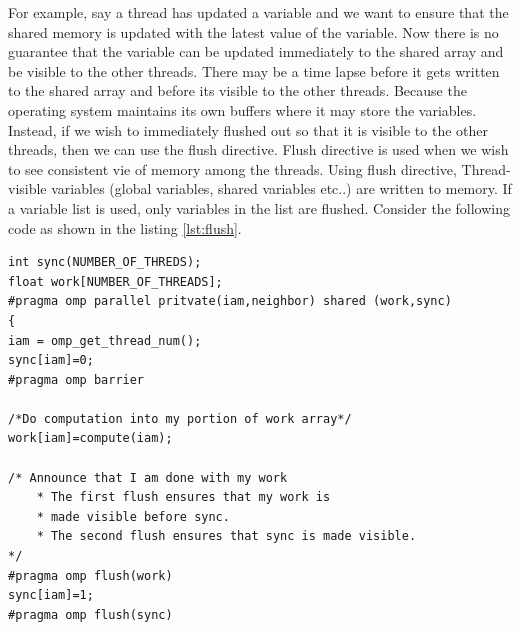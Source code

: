 \documentclass[12pt]{book}
\begin{document}
\begin{itemize}
    For example, say a thread has updated a variable and we want to ensure that the shared memory is updated with the latest value of the variable. Now there is no guarantee that the variable can be updated immediately to the shared array and be visible to the other threads. There may be a time lapse before it gets written to the shared array and before its visible to the other threads.
    Because the operating system maintains its own buffers where it may store the variables. Instead, if we wish to immediately flushed out so that it is visible to the other threads, then we can use the flush directive.
    Flush directive is used when we wish to see consistent vie of memory among the threads. Using flush directive, Thread-visible variables (global variables, shared variables etc..) are written to memory. If a variable list is used, only variables in the list are flushed.
    Consider the following code as shown in the listing \ref{lst:flush}.
\begin{lstlisting}[caption={Flush Directive},captionpos=b,label={lst:flush}]
int sync(NUMBER_OF_THREDS);
float work[NUMBER_OF_THREADS];
#pragma omp parallel pritvate(iam,neighbor) shared (work,sync)
{
iam = omp_get_thread_num();
sync[iam]=0;
#pragma omp barrier

/*Do computation into my portion of work array*/
work[iam]=compute(iam);

/* Announce that I am done with my work
    * The first flush ensures that my work is
    * made visible before sync.
    * The second flush ensures that sync is made visible.
*/
#pragma omp flush(work)
sync[iam]=1;
#pragma omp flush(sync)


\end{lstlisting}
\end{itemize}
\end{document}

